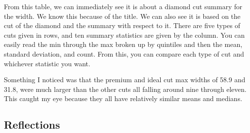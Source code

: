 \documentclass[
]{article}
\begin{document}
From this table, we can immediately see it is about a diamond cut
summary for the width. We know this because of the title. We can also
see it is based on the cut of the diamond and the summary with respect
to it. There are five types of cuts given in rows, and ten summary
statistics are given by the column. You can easily read the min through
the max broken up by quintiles and then the mean, standard deviation,
and count. From this, you can compare each type of cut and whichever
statistic you want.

Something I noticed was that the premium and ideal cut max widths of
58.9 and 31.8, were much larger than the other cuts all falling around
nine through eleven. This caught my eye because they all have relatively
similar means and medians.

\hypertarget{reflections}{%
\subsection{Reflections}\label{reflections}}
\end{document}
